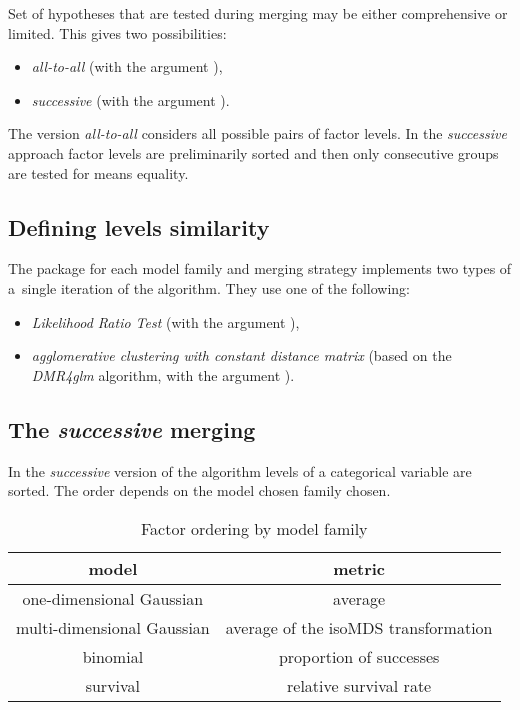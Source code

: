 Set of hypotheses that are tested during merging may be either comprehensive or limited. This gives two possibilities:

\begin{itemize}
\item \emph{all-to-all} (with the argument ),
\item \emph{successive} (with the argument ).

\end{itemize}


The version \emph{all-to-all} considers all possible pairs of factor levels. In the \emph{successive} approach factor levels are preliminarily sorted and then only consecutive groups are tested for means equality.

\subsection{Defining levels similarity}

The \factorMerger package for each model family and merging strategy implements two types of a~single iteration of the algorithm. They use one of the following:

\begin{itemize}

\item \emph{Likelihood Ratio Test} (with the argument ),
\item \emph{agglomerative clustering with constant distance matrix} (based on the \emph{DMR4glm} algorithm, with the argument ). 

\end{itemize}


\subsection{The \emph{successive} merging}

In the \emph{successive} version of the algorithm levels of a categorical variable are sorted. The order depends on the model chosen family chosen. 

\begin{table}[H]
\centering \begin{tabular}[t]{c|c}
\hline \textbf{model} & \textbf{metric} \\
\hline one-dimensional Gaussian & average \\
\hline multi-dimensional Gaussian & average of the isoMDS transformation \\
\hline binomial & proportion of successes \\
\hline survival & relative survival rate \\
\hline 

\end{tabular}
\caption{\label{tab:}Factor ordering by model family}

\end{table}

